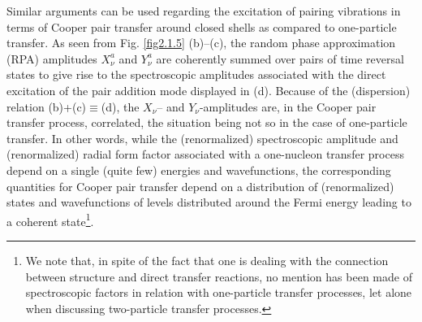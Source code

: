 Similar arguments can be used regarding the excitation of pairing vibrations in terms of Cooper pair transfer around closed shells as compared to one-particle transfer. As seen from Fig. \ref{fig2.1.5} (b)--(c), the random phase approximation (RPA) amplitudes $X_\nu^a$ and $Y^a_\nu$ are coherently summed over pairs of time reversal states to give rise to the spectroscopic amplitudes associated with the direct excitation of the pair addition mode displayed in (d). Because of the (dispersion) relation (b)+(c)$\equiv$(d), the $X_\nu$-- and $Y_\nu$-amplitudes are, in the Cooper pair transfer process, correlated, the situation being not so in the case of one-particle transfer. In other words, while the (renormalized) spectroscopic amplitude and (renormalized) radial form factor associated with a one-nucleon transfer process depend on a single (quite few) energies and wavefunctions, the corresponding quantities for Cooper pair transfer depend on a distribution of (renormalized) states and  wavefunctions of levels distributed around the Fermi energy leading to a coherent state\footnote{We note that, in spite of the fact that one is dealing with the connection between structure and direct transfer reactions, no mention has been made of spectroscopic factors in relation with one-particle transfer processes, let alone when discussing two-particle transfer processes.}. 
